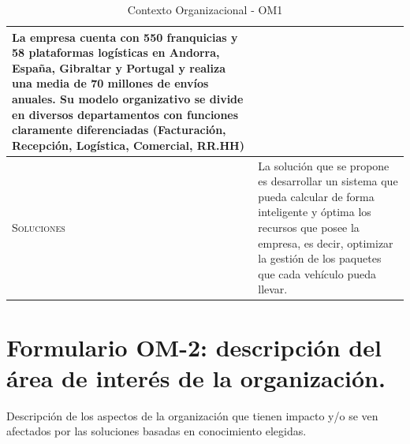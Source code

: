 \begin{table}[H]
\begin{tabularx}{\textwidth}{|l|X|}
    La empresa cuenta con 550 franquicias y 58 plataformas logísticas en Andorra, España, Gibraltar y Portugal y realiza una media de 70 millones de envíos anuales. Su modelo organizativo se divide en diversos departamentos con funciones claramente diferenciadas (Facturación, Recepción, Logística, Comercial, RR.HH) \\ 
    \hline
    \textsc{Soluciones} & La solución que se propone es desarrollar un sistema que pueda calcular de forma inteligente y óptima los recursos que posee la empresa, es decir, optimizar la gestión de los paquetes que cada vehículo pueda llevar. \\
    \hline
  \end{tabularx}
  \caption{\label{tab:OM1}Contexto Organizacional - OM1}
\end{table}
	
 
\section{Formulario OM-2: descripción del área de interés de la organización.}

Descripción de los aspectos de la organización que tienen impacto y/o se ven afectados
  por las soluciones basadas en conocimiento elegidas.


